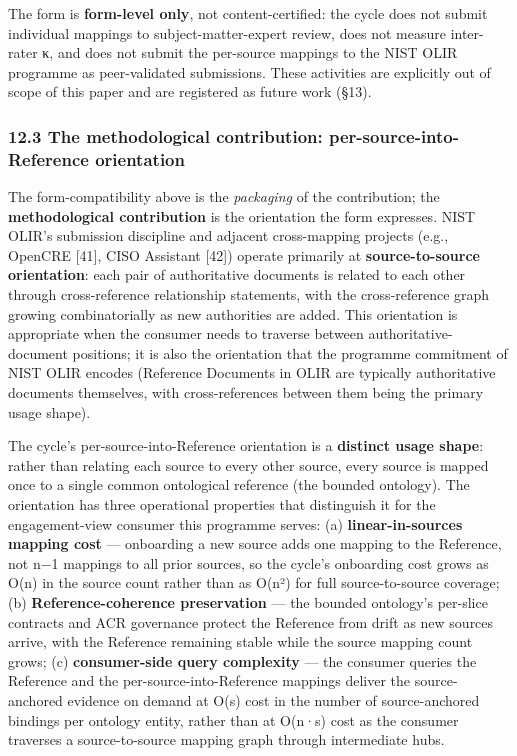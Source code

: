 \documentclass[
]{article}
\begin{document}
The form is \textbf{form-level only}, not content-certified: the cycle
does not submit individual mappings to subject-matter-expert review,
does not measure inter-rater κ, and does not submit the per-source
mappings to the NIST OLIR programme as peer-validated submissions. These
activities are explicitly out of scope of this paper and are registered
as future work (§13).

\subsubsection{12.3 The methodological contribution:
per-source-into-Reference
orientation}\label{the-methodological-contribution-per-source-into-reference-orientation}

The form-compatibility above is the \emph{packaging} of the
contribution; the \textbf{methodological contribution} is the
orientation the form expresses. NIST OLIR's submission discipline and
adjacent cross-mapping projects (e.g., OpenCRE {[}41{]}, CISO Assistant
{[}42{]}) operate primarily at \textbf{source-to-source orientation}:
each pair of authoritative documents is related to each other through
cross-reference relationship statements, with the cross-reference graph
growing combinatorially as new authorities are added. This orientation
is appropriate when the consumer needs to traverse between
authoritative-document positions; it is also the orientation that the
programme commitment of NIST OLIR encodes (Reference Documents in OLIR
are typically authoritative documents themselves, with cross-references
between them being the primary usage shape).

The cycle's per-source-into-Reference orientation is a \textbf{distinct
usage shape}: rather than relating each source to every other source,
every source is mapped once to a single common ontological reference
(the bounded ontology). The orientation has three operational properties
that distinguish it for the engagement-view consumer this programme
serves: (a) \textbf{linear-in-sources mapping cost} --- onboarding a new
source adds one mapping to the Reference, not n−1 mappings to all prior
sources, so the cycle's onboarding cost grows as O(n) in the source
count rather than as O(n²) for full source-to-source coverage; (b)
\textbf{Reference-coherence preservation} --- the bounded ontology's
per-slice contracts and ACR governance protect the Reference from drift
as new sources arrive, with the Reference remaining stable while the
source mapping count grows; (c) \textbf{consumer-side query complexity}
--- the consumer queries the Reference and the per-source-into-Reference
mappings deliver the source-anchored evidence on demand at O(s) cost in
the number of source-anchored bindings per ontology entity, rather than
at O(n·s) cost as the consumer traverses a source-to-source mapping
graph through intermediate hubs.
\end{document}
